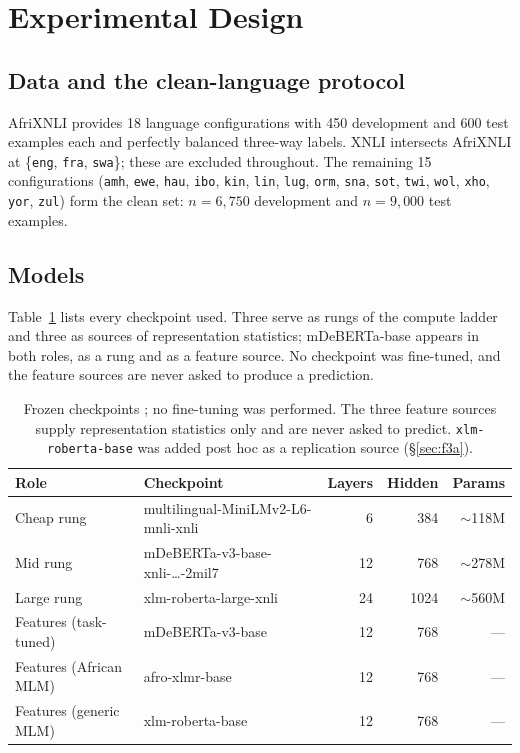 \documentclass[11pt]{article}
\begin{document}
\section{Experimental Design}
\label{sec:design}

\subsection{Data and the clean-language protocol}
AfriXNLI \citep{adelani-etal-2025-irokobench} provides 18 language configurations with 450
development and 600 test examples each and perfectly balanced three-way labels.
XNLI intersects AfriXNLI at \{\texttt{eng}, \texttt{fra}, \texttt{swa}\}; these
are excluded throughout. The remaining 15 configurations (\texttt{amh},
\texttt{ewe}, \texttt{hau}, \texttt{ibo}, \texttt{kin}, \texttt{lin},
\texttt{lug}, \texttt{orm}, \texttt{sna}, \texttt{sot}, \texttt{twi},
\texttt{wol}, \texttt{xho}, \texttt{yor}, \texttt{zul}) form the clean set:
$n=6{,}750$ development and $n=9{,}000$ test examples.

\subsection{Models}
Table~\ref{tab:models} lists every checkpoint used. Three serve as rungs of the
compute ladder and three as sources of representation statistics; mDeBERTa-base
appears in both roles, as a rung and as a feature source. No checkpoint was
fine-tuned, and the feature sources are never asked to produce a prediction.

\begin{table}[t]
\centering
\small
\begin{tabular}{llrrr}
\toprule
Role & Checkpoint & Layers & Hidden & Params \\
\midrule
Cheap rung   & multilingual-MiniLMv2-L6-mnli-xnli & 6  & 384  & $\sim$118M \\
Mid rung     & mDeBERTa-v3-base-xnli-\dots-2mil7  & 12 & 768  & $\sim$278M \\
Large rung   & xlm-roberta-large-xnli             & 24 & 1024 & $\sim$560M \\
\midrule
Features (task-tuned)  & mDeBERTa-v3-base & 12 & 768 & --- \\
Features (African MLM) & afro-xlmr-base   & 12 & 768 & --- \\
Features (generic MLM) & xlm-roberta-base & 12 & 768 & --- \\
\bottomrule
\end{tabular}
\caption{Frozen checkpoints \citep{wang-etal-2021-minilmv2,he2023debertav3,
conneau-etal-2020-unsupervised,alabi-etal-2022-adapting}; no fine-tuning was
performed. The three feature
sources supply representation statistics only and are never asked to predict.
\texttt{xlm-roberta-base} was added post hoc as a replication source
(\S\ref{sec:f3a}).}
\label{tab:models}
\end{table}
\end{document}
